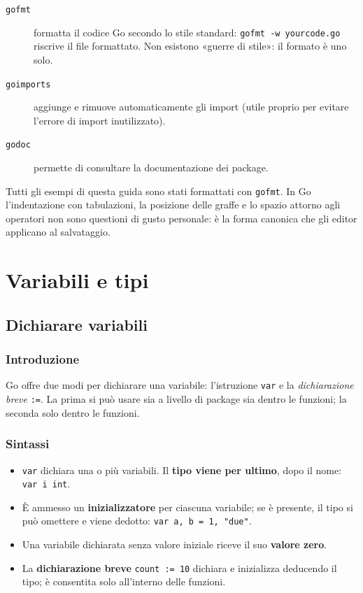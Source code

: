 \documentclass[11pt,a4paper]{report}
\newcommand{\cod}[1]{\texttt{#1}}
\begin{document}
\begin{description}
  \item[\texttt{gofmt}] formatta il codice Go secondo lo stile standard:
        \cod{gofmt -w yourcode.go} riscrive il file formattato. Non esistono
        «guerre di stile»: il formato è uno solo.
  \item[\texttt{goimports}] aggiunge e rimuove automaticamente gli import
        (utile proprio per evitare l'errore di import inutilizzato).
  \item[\texttt{godoc}] permette di consultare la documentazione dei package.
\end{description}

\begin{nota}
Tutti gli esempi di questa guida sono stati formattati con \cod{gofmt}. In Go
l'indentazione con tabulazioni, la posizione delle graffe e lo spazio attorno
agli operatori non sono questioni di gusto personale: è la forma canonica che
gli editor applicano al salvataggio.
\end{nota}

\chapter{Variabili e tipi}\label{ch:tipi}

\section{Dichiarare variabili}

\subsection{Introduzione}

Go offre due modi per dichiarare una variabile: l'istruzione \cod{var} e la
\emph{dichiarazione breve} \cod{:=}. La prima si può usare sia a livello di
package sia dentro le funzioni; la seconda solo dentro le funzioni.

\subsection{Sintassi}

\begin{itemize}
  \item \cod{var} dichiara una o più variabili. Il \textbf{tipo viene per ultimo},
        dopo il nome: \cod{var i int}.
  \item È ammesso un \textbf{inizializzatore} per ciascuna variabile; se è
        presente, il tipo si può omettere e viene dedotto: \cod{var a, b = 1, "due"}.
  \item Una variabile dichiarata senza valore iniziale riceve il suo
        \textbf{valore zero}.
  \item La \textbf{dichiarazione breve} \cod{count := 10} dichiara e inizializza
        deducendo il tipo; è consentita solo all'interno delle funzioni.
\end{itemize}
\end{document}
